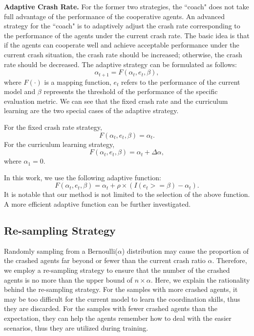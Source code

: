 \documentclass{article}
\begin{document}
\textbf{Adaptive Crash Rate.}
For the former two strategies, the ``coach" does not take full advantage of the performance of the cooperative agents.
An advanced strategy for the ``coach" is to adaptively adjust the crash rate corresponding to the performance of the agents under the current crash rate.
The basic idea is that if the agents can cooperate well and achieve acceptable performance under the current crash situation, the crash rate should be increased; otherwise, the crash rate should be decreased.
The adaptive strategy can be formulated as follows:
\begin{equation}
    \alpha_{t+1} = F(\alpha_t, e_t, \beta),
\end{equation}
where $F(\cdot)$ is a mapping function, $e_t$ refers to the performance of the current model and $\beta$ represents the threshold of the performance of the specific evaluation metric.
We can see that the fixed crash rate and the curriculum learning are the two special cases of the adaptive strategy.

\noindent For the fixed crash rate strategy,
\begin{equation}
    F(\alpha_t, e_t, \beta) = \alpha_t.
\end{equation}
For the curriculum learning strategy,
\begin{equation}
    F(\alpha_t, e_t, \beta) = \alpha_t + \Delta\alpha,
\end{equation}
where $\alpha_1 = 0$. 

\noindent In this work, we use the following adaptive function:
\begin{equation}
    F(\alpha_t, e_t, \beta) = \alpha_t + \rho\times(I(e_t>=\beta)-\alpha_t).
\end{equation}
It is notable that our method is not limited to the selection of the above function. A more efficient adaptive function can be further investigated.

\subsection{Re-sampling Strategy}
Randomly sampling from a Bernoulli($\alpha$) distribution may cause the proportion of the crashed agents far beyond or fewer than the current crash ratio $\alpha$.
Therefore, we employ a re-sampling strategy to ensure that the number of the crashed agents is no more than the upper bound of $n\times \alpha$.
Here, we explain the rationality behind the re-sampling strategy.
For the samples with more crashed agents, it may be too difficult for the current model to learn the coordination skills, thus they are discarded.
For the samples with fewer crashed agents than the expectation, they can help the agents remember how to deal with the easier scenarios, thus they are utilized during training.
\end{document}
